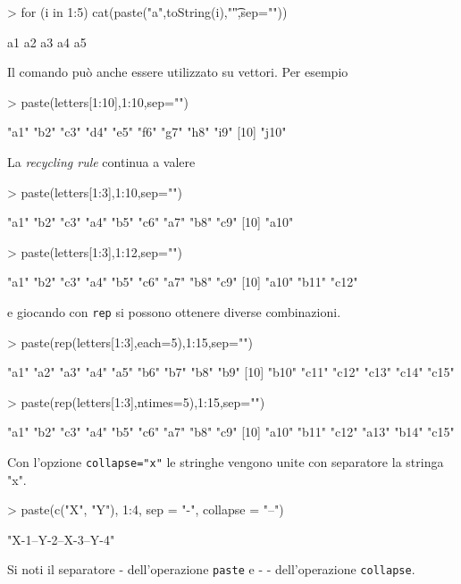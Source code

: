 \documentclass[onecolumn,12pt]{book}
\begin{document}
\begin{Schunk}
\begin{Sinput}
> for (i in 1:5) cat(paste("a",toString(i),"\t",sep=""))
\end{Sinput}
\begin{Soutput}
a1	a2	a3	a4	a5	
\end{Soutput}
\end{Schunk}
Il comando pu\`o anche essere utilizzato su vettori.
Per esempio
\begin{Schunk}
\begin{Sinput}
> paste(letters[1:10],1:10,sep="")
\end{Sinput}
\begin{Soutput}
 [1] "a1"  "b2"  "c3"  "d4"  "e5"  "f6"  "g7"  "h8"  "i9" 
[10] "j10"
\end{Soutput}
\end{Schunk}
La \textit{recycling rule} continua a valere

\begin{Schunk}
\begin{Sinput}
> paste(letters[1:3],1:10,sep="")
\end{Sinput}
\begin{Soutput}
 [1] "a1"  "b2"  "c3"  "a4"  "b5"  "c6"  "a7"  "b8"  "c9" 
[10] "a10"
\end{Soutput}
\begin{Sinput}
> paste(letters[1:3],1:12,sep="")
\end{Sinput}
\begin{Soutput}
 [1] "a1"  "b2"  "c3"  "a4"  "b5"  "c6"  "a7"  "b8"  "c9" 
[10] "a10" "b11" "c12"
\end{Soutput}
\end{Schunk}
e giocando con \texttt{rep} si possono ottenere diverse combinazioni.
\begin{Schunk}
\begin{Sinput}
> paste(rep(letters[1:3],each=5),1:15,sep="")
\end{Sinput}
\begin{Soutput}
 [1] "a1"  "a2"  "a3"  "a4"  "a5"  "b6"  "b7"  "b8"  "b9" 
[10] "b10" "c11" "c12" "c13" "c14" "c15"
\end{Soutput}
\begin{Sinput}
> paste(rep(letters[1:3],ntimes=5),1:15,sep="")
\end{Sinput}
\begin{Soutput}
 [1] "a1"  "b2"  "c3"  "a4"  "b5"  "c6"  "a7"  "b8"  "c9" 
[10] "a10" "b11" "c12" "a13" "b14" "c15"
\end{Soutput}
\end{Schunk}
Con l'opzione \texttt{collapse="x"} le stringhe vengono unite con separatore la stringa "x".
\begin{Schunk}
\begin{Sinput}
> paste(c("X", "Y"), 1:4, sep = "-", collapse = "--")
\end{Sinput}
\begin{Soutput}
[1] "X-1--Y-2--X-3--Y-4"
\end{Soutput}
\end{Schunk}
Si noti il separatore - dell'operazione \texttt{paste} e  - - dell'operazione \texttt{collapse}.
\end{document}
